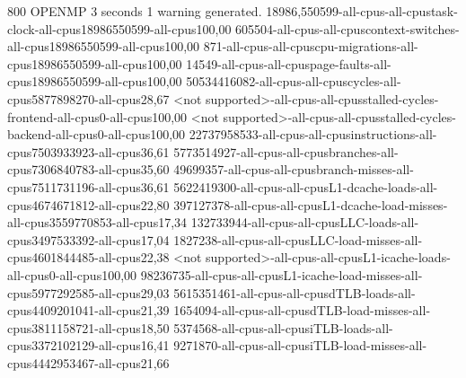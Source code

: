 
800
OPENMP
3 seconds
1 warning generated.
18986,550599-all-cpus-all-cpustask-clock-all-cpus18986550599-all-cpus100,00
605504-all-cpus-all-cpuscontext-switches-all-cpus18986550599-all-cpus100,00
871-all-cpus-all-cpuscpu-migrations-all-cpus18986550599-all-cpus100,00
14549-all-cpus-all-cpuspage-faults-all-cpus18986550599-all-cpus100,00
50534416082-all-cpus-all-cpuscycles-all-cpus5877898270-all-cpus28,67
<not supported>-all-cpus-all-cpusstalled-cycles-frontend-all-cpus0-all-cpus100,00
<not supported>-all-cpus-all-cpusstalled-cycles-backend-all-cpus0-all-cpus100,00
22737958533-all-cpus-all-cpusinstructions-all-cpus7503933923-all-cpus36,61
5773514927-all-cpus-all-cpusbranches-all-cpus7306840783-all-cpus35,60
49699357-all-cpus-all-cpusbranch-misses-all-cpus7511731196-all-cpus36,61
5622419300-all-cpus-all-cpusL1-dcache-loads-all-cpus4674671812-all-cpus22,80
397127378-all-cpus-all-cpusL1-dcache-load-misses-all-cpus3559770853-all-cpus17,34
132733944-all-cpus-all-cpusLLC-loads-all-cpus3497533392-all-cpus17,04
1827238-all-cpus-all-cpusLLC-load-misses-all-cpus4601844485-all-cpus22,38
<not supported>-all-cpus-all-cpusL1-icache-loads-all-cpus0-all-cpus100,00
98236735-all-cpus-all-cpusL1-icache-load-misses-all-cpus5977292585-all-cpus29,03
5615351461-all-cpus-all-cpusdTLB-loads-all-cpus4409201041-all-cpus21,39
1654094-all-cpus-all-cpusdTLB-load-misses-all-cpus3811158721-all-cpus18,50
5374568-all-cpus-all-cpusiTLB-loads-all-cpus3372102129-all-cpus16,41
9271870-all-cpus-all-cpusiTLB-load-misses-all-cpus4442953467-all-cpus21,66
